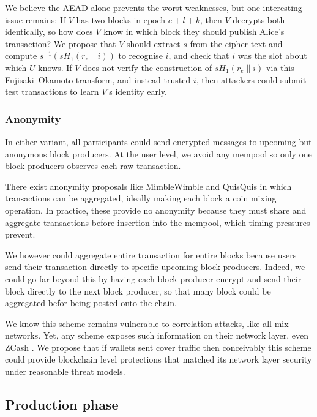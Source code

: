 We believe the AEAD alone prevents the worst weaknesses, but one interesting issue remains:  If $V$ has two blocks in epoch $e+l+k$, then $V$ decrypts both identically, so how does $V$ know in which block they should publish Alice's transaction?  We propose that $V$ should extract $s$ from the cipher text and compute $s^{-1} (s H_1(r_e \| i))$ to recognise $i$, and check that $i$ was the slot about which $U$ knows.  If $V$ does not verify the construction of $s H_1(r_e \| i)$ via this Fujisaki–Okamoto transform, and instead trusted $i$, then attackers could submit test transactions to learn $V$'s identity early. 


\subsubsection{Anonymity}

In either variant, all participants could send encrypted messages to upcoming but anonymous block producers.  At the user level, we avoid any mempool so only one block producers observes each raw transaction.  

There exist anonymity proposals like MimbleWimble \cite{MimbleWimble} and QuisQuis \cite{QuisQuis} in which transactions can be aggregated, ideally making each block a coin mixing operation.  In practice, these provide no anonymity because they must share and aggregate transactions before insertion into the mempool, which timing pressures prevent.  

We however could aggregate entire transaction for entire blocks because users send their transaction directly to specific upcoming block producers.  Indeed, we could go far beyond this by having each block producer encrypt and send their block directly to the next block producer, so that many block could be aggregated befor being posted onto the chain.

We know this scheme remains vulnerable to correlation attacks, like all mix networks.  Yet, any scheme exposes such information on their network layer, even ZCash \cite{ZCash_vulnerable_2019}.  We propose that if wallets sent cover traffic then conceivably this scheme could provide blockchain level protections that matched its network layer security under reasonable threat models. 


\subsection{Production phase}\label{subsec:production_phase}

